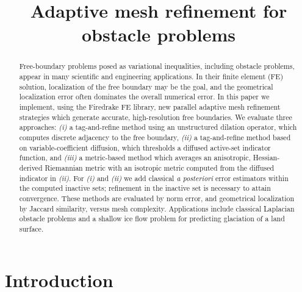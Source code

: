\documentclass[]{interact}
\theoremstyle{plain}%
\theoremstyle{definition}
\theoremstyle{remark}
\begin{document}

\title{Adaptive mesh refinement for obstacle problems}

\author{
}

\maketitle

\begin{abstract}
Free-boundary problems posed as variational inequalities, including obstacle problems, appear in many scientific and engineering applications.  In their finite element (FE) solution, localization of the free boundary may be the goal, and the geometrical localization error often dominates the overall numerical error.  In this paper we implement, using the Firedrake FE library, new parallel adaptive mesh refinement strategies which generate accurate, high-resolution free boundaries.  We evaluate three approaches: \emph{(i)} a tag-and-refine method using an unstructured dilation operator, which computes discrete adjacency to the free boundary, \emph{(ii)} a tag-and-refine method based on variable-coefficient diffusion, which thresholds a diffused active-set indicator function, and \emph{(iii)} a metric-based method which averages an anisotropic, Hessian-derived Riemannian metric with an isotropic metric computed from the diffused indicator in \emph{(ii)}.  For \emph{(i)} and \emph{(ii)} we add classical \emph{a posteriori} error estimators within the computed inactive sets; refinement in the inactive set is necessary to attain convergence.  These methods are evaluated by norm error, and geometrical localization by Jaccard similarity, versus mesh complexity.  Applications include classical Laplacian obstacle problems and a shallow ice flow problem for predicting glaciation of a land surface.
\end{abstract}

%


\section{Introduction} \label{sec:intro}
\end{document}
